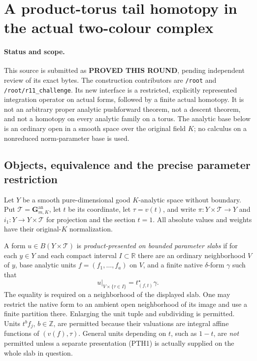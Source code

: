 \section{A product-torus tail homotopy in the actual two-colour complex}
\label{sec:r12-product-torus-tail-homotopy}

\paragraph{Status and scope.}
This source is submitted as \textbf{PROVED THIS ROUND}, pending
independent review of its exact bytes.  The construction contributors
are \texttt{/root} and \texttt{/root/r11\_challenge}.  Its new interface
is a restricted, explicitly represented integration operator on actual
forms, followed by a finite actual homotopy.  It is not an arbitrary
proper analytic pushforward theorem, not a descent theorem, and not
a homotopy on every analytic family on a torus.  The analytic base
below is an ordinary open in a smooth space over the original field
$K$; no calculus on a nonreduced norm-parameter base is used.

\subsection{Objects, equivalence and the precise parameter restriction}

Let $Y$ be a smooth pure-dimensional good $K$-analytic space without
boundary.  Put $\mathcal T=\mathbf G_{m,K}^{\mathrm{an}}$, let $t$
be its coordinate, let $\tau=v(t)$, and write
$\pi:Y\times\mathcal T\to Y$ and $i_1:Y\to Y\times\mathcal T$
for projection and the section $t=1$.  All absolute values and
weights have their original-$K$ normalization.

A form $u\in B(Y\times\mathcal T)$ is \emph{product-presented on
bounded parameter slabs} if for each $y\in Y$ and each compact
interval $I\subset\mathbb R$ there are an ordinary neighborhood
$V$ of $y$, base analytic units $f=(f_1,\ldots,f_a)$ on $V$, and
a finite native $\delta$-form $\gamma$ such that
\[
 u|_{V\times\{\tau\in I\}}=t_{(f,t)}^\star\gamma.
 \tag{PTH1}
\]
The equality is required on a neighborhood of the displayed slab.
One may restrict the native form to an ambient open neighborhood
of its image and use a finite partition there.  Enlarging the unit
tuple and subdividing is permitted.  Units $t^b f_j$, $b\in\mathbb Z$,
are permitted because their valuations are integral affine functions
of $(v(f),\tau)$.  General units depending on $t$, such as $1-t$,
are \emph{not} permitted unless a separate presentation (PTH1) is
actually supplied on the whole slab in question.

